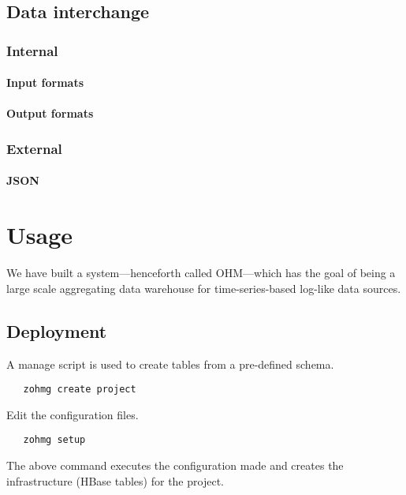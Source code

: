 \documentclass[a4paper,10pt]{book}
\begin{document}
\section{Data interchange}

\subsection{Internal}

\subsubsection{Input formats}

\subsubsection{Output formats}

\subsection{External}

\subsubsection{JSON}


\chapter{Usage}

We have built a system---henceforth called OHM---which has the goal of being
a large scale aggregating data warehouse for time-series-based log-like
data sources.



\section{Deployment}

A manage script is used to create tables from a pre-defined schema.

\begin{verbatim}
   zohmg create project
\end{verbatim}

\noindent Edit the configuration files.

\begin{verbatim}
   zohmg setup
\end{verbatim}

\noindent The above command executes the configuration made and creates the
infrastructure (HBase tables) for the project.
\end{document}
